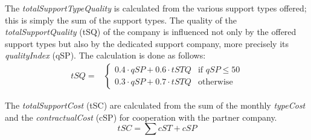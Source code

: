 The \textit{totalSupportTypeQuality} is calculated from the various support types offered; this is simply the sum of the support types. The quality of the \textit{totalSupportQuality} (\gls{tSQ}) of the company is influenced not only by the offered support types but also by the dedicated support company, more precisely its \textit{qualityIndex} (\gls{qSP}). The calculation is done as follows:
\begin{equation}
\label{func:totalProductSupport}
\begin{aligned}
    tSQ = &
    \begin{cases}
        0.4 \cdot qSP + 0.6 \cdot tSTQ & \text{if } qSP \leq  50\\
        0.3 \cdot qSP + 0.7 \cdot tSTQ & \text{otherwise}
    \end{cases}
\end{aligned}
\end{equation}

The \textit{totalSupportCost} (\gls{tSC}) are calculated from the sum of the monthly \textit{typeCost} and the \textit{contractualCost} (\gls{cSP}) for cooperation with the partner company.
\begin{equation}
\label{func:totalSupportCost}
    tSC = \sum cST + cSP
\end{equation}